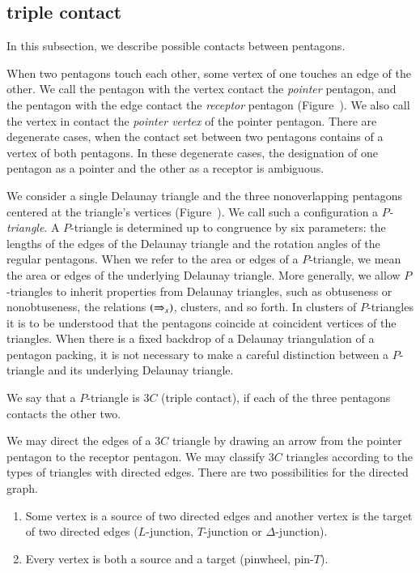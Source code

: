\subsection{triple contact}

In this subsection, we describe possible contacts between pentagons.

When two pentagons touch each other, some vertex of one touches an
edge of the other.  We call the pentagon with the vertex contact the
{\it pointer} pentagon, and the pentagon with the edge contact the
{\it receptor} pentagon (Figure~).  We also call the
vertex in contact the {\it pointer vertex} of the pointer pentagon. There are
degenerate cases, when the contact set between two pentagons contains
of a vertex of both pentagons.  In these degenerate cases, the
designation of one pentagon as a pointer and the other as a receptor
is ambiguous.



We consider a single Delaunay triangle and the three nonoverlapping
pentagons centered at the triangle's vertices
(Figure~).  We call such a configuration a {\it
  $P$-triangle}.  A $P$-triangle is determined up to congruence by six
parameters: the lengths of the edges of the Delaunay triangle and the
rotation angles of the regular pentagons.  When we refer to the area
or edges of a $P$-triangle, we mean the area or edges of the
underlying Delaunay triangle.  More generally, we allow $P$-triangles
to inherit properties from Delaunay triangles, such as obtuseness or
nonobtuseness, the relations $(\Rightarrow_{x})$, clusters, and so forth. In
clusters of $P$-triangles it is to be understood that the pentagons
coincide at coincident vertices of the triangles.  When there is a
fixed backdrop of a Delaunay triangulation of a pentagon packing, it
is not necessary to make a careful distinction between a
$P$-triangle and its underlying Delaunay triangle.

We say that a $P$-triangle is $3C$ (triple contact),
if each of the three pentagons contacts the other two.

We may direct the edges of a $3C$ triangle by drawing an arrow from
the pointer pentagon to the receptor pentagon.  We may classify $3C$
triangles according to the types of triangles with directed edges.
There are two possibilities for the directed graph.
\begin{enumerate}
\item Some vertex is a source of two directed edges and another vertex
is the target of two directed edges  ($L$-junction, $T$-junction or
  $\Delta$-junction).
\item Every vertex is both a source and a target (pinwheel, pin-$T$).
\end{enumerate}

